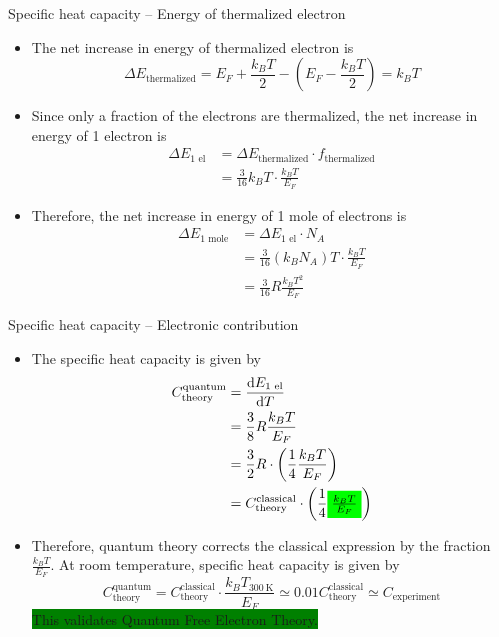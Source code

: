 \begin{frame}[label=pre-M2T1-slot1]{Specific heat capacity -- Energy of thermalized electron}
	\begin{itemize}
		\item The net increase in energy of thermalized electron is 
		\[
		\Delta E_\text{thermalized} = E_F+\frac{k_BT}{2} - \left(E_F-\frac{k_BT}{2}\right) = k_B T
		\]
		\item Since only a fraction of the electrons are thermalized, the net increase in energy of 1  electron is
		\begin{align*}
			\Delta E_\text{1 el} &= \Delta E_\text{thermalized} \cdot f_\text{thermalized}	\\
			&= \frac{3}{16} k_B T \cdot \frac{k_B T}{E_F}
		\end{align*}
		\item Therefore, the net increase in energy of 1 mole of electrons is
		\begin{align*}
			\Delta E_\text{1 mole} &= \Delta E_\text{1 el} \cdot N_A	\\
			&= \frac{3}{16} (k_B N_A) T \cdot \frac{k_B T}{E_F}\\
			&= \frac{3}{16} R \frac{k_B T^2}{E_F}
		\end{align*}
	\end{itemize}
\end{frame}
%
\begin{frame}[label=pre-M2T1-slot1]{Specific heat capacity -- Electronic contribution}
\begin{small}
			\begin{itemize}
		\item The specific heat capacity is given by
		\begin{align*}
			C_\text{theory}^\text{quantum} &= \frac{\mathrm{d}E_\text{1 el}}{\mathrm{d}T}\\
			&= \frac{3}{8} R \frac{k_B T}{E_F}\\
			&= \frac{3}{2} R \cdot \left(\frac{1}{4}\frac{k_B T}{E_F}\right)	\\
			& = C_\text{theory}^\text{classical}  \cdot \left(\frac{1}{4}\colorbox{green}{$\frac{k_B T}{E_F}$}\right)
		\end{align*}
		\begin{center}
		\end{center}
		\item Therefore, quantum theory corrects the classical expression by the fraction \(\tfrac{k_B T}{E_F}\). At room temperature, specific heat capacity is given by
		\[
			C_\text{theory}^\text{quantum} = C_\text{theory}^\text{classical} \cdot \frac{k_B T_{\SI{300}{\kelvin}}}{E_F}  \simeq 0.01 C_\text{theory}^\text{classical} \simeq C_\text{experiment}
		\]
		\colorbox{green}{This validates Quantum Free Electron Theory.}
	\end{itemize}
\end{small}
\end{frame}
